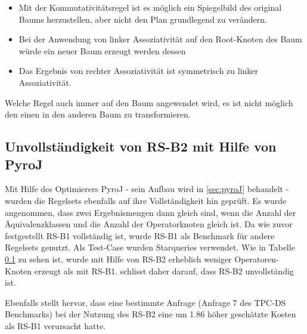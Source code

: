 \begin{itemize}
\item Mit der Kommutativitätsregel ist es möglich ein Spiegelbild des original Baums herzustellen, aber nicht den Plan grundlegend zu verändern.
\item Bei der Anwendung von linker Assoziativität auf den Root-Knoten des Baum würde ein neuer Baum erzeugt werden dessen
\item Das Ergebnis von rechter Assoziativität ist symmetrisch zu linker Assoziativität.
\end{itemize}


Welche Regel auch immer auf den Baum angewendet wird, es ist nicht möglich den einen in den anderen Baum zu transformieren.

\subsection{Unvollständigkeit von RS-B2 mit Hilfe von PyroJ}

Mit Hilfe des Optimierers PyroJ - sein Aufbau wird in \ref{sec:pyroJ} behandelt - wurden die Regelsets ebenfalls auf ihre Vollständigkeit hin geprüft. Es wurde angenommen, dass zwei Ergebnismengen dann gleich sind, wenn die Anzahl der Äquivalenzklassen und die Anzahl der Operatorknoten gleich ist. Da wie zuvor festgestellt RS-B1 vollständig ist, wurde RS-B1 als Benchmark für andere Regelsets genutzt. Als Test-Case wurden Starqueries verwendet. Wie in Tabelle \ref{} zu sehen ist, wurde mit Hilfe von RS-B2 erheblich weniger Operatoren-Knoten erzeugt als mit RS-B1. \cite{} schlisst daher darauf, dass RS-B2 unvollständig ist.

Ebenfalls stellt \cite{} hervor, dass eine bestimmte Anfrage (Anfrage 7 des TPC-DS Benchmarks) bei der Nutzung des RS-B2 eine um 1.86 höher geschätzte Kosten als RS-B1 verursacht hatte.

